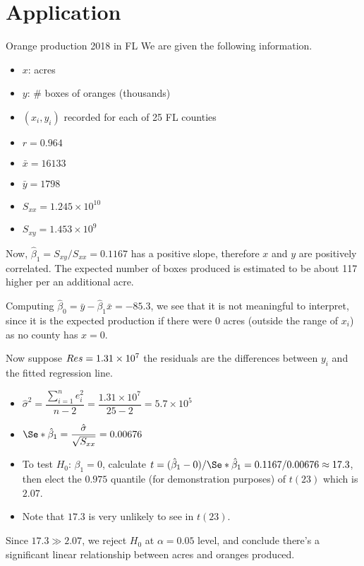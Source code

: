 \section{Application}
\begin{Example}{Orange production 2018 in FL}{}
  We are given the following information.
  \begin{itemize}
    \item $ x $: acres
    \item $ y $: \# boxes of oranges (thousands)
    \item $ (x_i,y_i) $ recorded for each of 25 FL counties
    \item $ r=0.964 $
    \item $ \bar{x}=16133 $
    \item $ \bar{y}=1798 $
    \item $ S_{xx}=1.245\times 10^{10} $
    \item $ S_{xy}=1.453\times 10^9 $
  \end{itemize}
  Now,
  $ \hat{\beta}_1=S_{xy}/S_{xx}=0.1167 $
  has a positive slope, therefore $ x $ and $ y $ are
  positively correlated.
  The expected number of boxes produced is estimated to be about 117
  higher per an additional acre.

  Computing
  $ \hat{\beta}_0=\bar{y}-\hat{\beta}_1\bar{x}=-85.3 $,
  we see that it is
  not meaningful to interpret, since it
  is the expected production if there were 0 acres
  (outside the range of $ x_i $) as no county has $ x=0 $.

  Now suppose $ \relax{Res}=1.31\times 10^7 $
  the residuals are the differences between $ y_i $ and the fitted regression
  line.
  \begin{itemize}
    \item $ \hat{\sigma}^2=\dfrac{\sum_{i=1}^{n} e_i^2}{n-2}=
            \dfrac{1.31\times 10^7}{25-2}=5.7\times 10^5 $
    \item $ \Se*{\hat{\beta}_1}=\dfrac{\hat{\sigma}}{\sqrt{S_{xx}}}=0.00676 $
    \item To test $ H_0 $: $ \beta_1 =0 $,
          calculate
          $ t=(\hat{\beta}_1-0)/\Se*{\hat{\beta}_1}=0.1167/0.00676
            \approx 17.3 $,
          then elect the $ 0.975 $ quantile (for demonstration purposes) of $ t(23) $
          which is $ 2.07 $.
    \item Note that $ 17.3 $ is very unlikely to see in $ t(23) $.
  \end{itemize}
  Since $ 17.3\gg2.07 $, we reject $ H_0 $ at $ \alpha=0.05 $
  level, and conclude there's a significant linear relationship between
  acres and oranges produced.


\end{Example}
